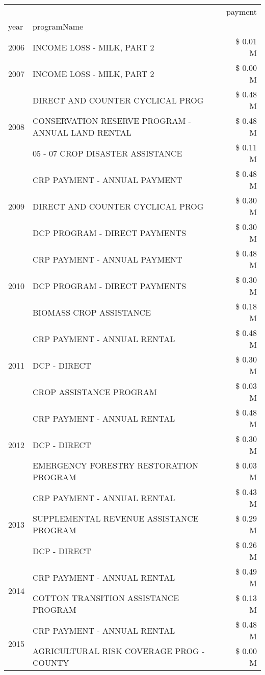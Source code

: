 \begin{tabular}{llr}
\toprule
 &  & payment \\
year & programName &  \\
\midrule
2006 & INCOME LOSS - MILK, PART 2 & \$ 0.01 M \\
\cline{1-3}
2007 & INCOME LOSS - MILK, PART 2 & \$ 0.00 M \\
\cline{1-3}
\multirow[t]{3}{*}{2008} & DIRECT AND COUNTER CYCLICAL PROG & \$ 0.48 M \\
 & CONSERVATION RESERVE PROGRAM - ANNUAL LAND RENTAL & \$ 0.48 M \\
 & 05 - 07 CROP DISASTER ASSISTANCE & \$ 0.11 M \\
\cline{1-3}
\multirow[t]{3}{*}{2009} & CRP PAYMENT - ANNUAL PAYMENT & \$ 0.48 M \\
 & DIRECT AND COUNTER CYCLICAL PROG & \$ 0.30 M \\
 & DCP PROGRAM - DIRECT PAYMENTS & \$ 0.30 M \\
\cline{1-3}
\multirow[t]{3}{*}{2010} & CRP PAYMENT - ANNUAL PAYMENT & \$ 0.48 M \\
 & DCP PROGRAM - DIRECT PAYMENTS & \$ 0.30 M \\
 & BIOMASS CROP ASSISTANCE & \$ 0.18 M \\
\cline{1-3}
\multirow[t]{3}{*}{2011} & CRP PAYMENT - ANNUAL RENTAL & \$ 0.48 M \\
 & DCP - DIRECT & \$ 0.30 M \\
 & CROP ASSISTANCE PROGRAM & \$ 0.03 M \\
\cline{1-3}
\multirow[t]{3}{*}{2012} & CRP PAYMENT - ANNUAL RENTAL & \$ 0.48 M \\
 & DCP - DIRECT & \$ 0.30 M \\
 & EMERGENCY FORESTRY RESTORATION PROGRAM & \$ 0.03 M \\
\cline{1-3}
\multirow[t]{3}{*}{2013} & CRP PAYMENT - ANNUAL RENTAL & \$ 0.43 M \\
 & SUPPLEMENTAL REVENUE ASSISTANCE PROGRAM & \$ 0.29 M \\
 & DCP - DIRECT & \$ 0.26 M \\
\cline{1-3}
\multirow[t]{2}{*}{2014} & CRP PAYMENT - ANNUAL RENTAL & \$ 0.49 M \\
 & COTTON TRANSITION ASSISTANCE PROGRAM & \$ 0.13 M \\
\cline{1-3}
\multirow[t]{2}{*}{2015} & CRP PAYMENT - ANNUAL RENTAL & \$ 0.48 M \\
 & AGRICULTURAL RISK COVERAGE PROG - COUNTY & \$ 0.00 M \\

\end{tabular}
